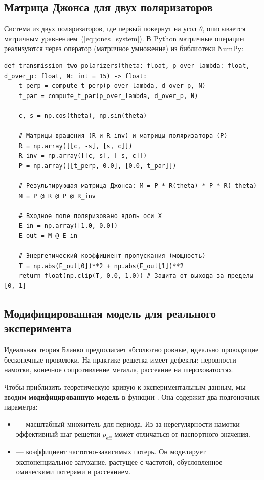 \subsection{Матрица Джонса для двух поляризаторов}

Система из двух поляризаторов, где первый повернут на угол $\theta$, описывается матричным уравнением~(\ref{eq:jones_system}). В Python матричные операции реализуются через оператор  (матричное умножение) из библиотеки NumPy:

\begin{verbatim}
def transmission_two_polarizers(theta: float, p_over_lambda: float, d_over_p: float, N: int = 15) -> float:
    t_perp = compute_t_perp(p_over_lambda, d_over_p, N)
    t_par = compute_t_par(p_over_lambda, d_over_p, N)

    c, s = np.cos(theta), np.sin(theta)

    # Матрицы вращения (R и R_inv) и матрицы поляризатора (P)
    R = np.array([[c, -s], [s, c]])
    R_inv = np.array([[c, s], [-s, c]])
    P = np.array([[t_perp, 0.0], [0.0, t_par]])

    # Результирующая матрица Джонса: M = P * R(theta) * P * R(-theta)
    M = P @ R @ P @ R_inv

    # Входное поле поляризовано вдоль оси X
    E_in = np.array([1.0, 0.0])
    E_out = M @ E_in

    # Энергетический коэффициент пропускания (мощность)
    T = np.abs(E_out[0])**2 + np.abs(E_out[1])**2
    return float(np.clip(T, 0.0, 1.0)) # Защита от выхода за пределы [0, 1]
\end{verbatim}

\subsection{Модифицированная модель для реального эксперимента}

Идеальная теория Бланко предполагает абсолютно ровные, идеально проводящие бесконечные проволоки. На практике решетка имеет дефекты: неровности намотки, конечное сопротивление металла, рассеяние на шероховатостях.

Чтобы приблизить теоретическую кривую к экспериментальным данным, мы вводим \textbf{модифицированную модель} в функции . Она содержит два подгоночных параметра:
\begin{itemize}
    \item {} --- масштабный множитель для периода. Из-за нерегулярности намотки эффективный шаг решетки $p_{\text{eff}}$ может отличаться от паспортного значения.
    \item {} --- коэффициент частотно-зависимых потерь. Он моделирует экспоненциальное затухание, растущее с частотой, обусловленное омическими потерями и рассеянием.
\end{itemize}

